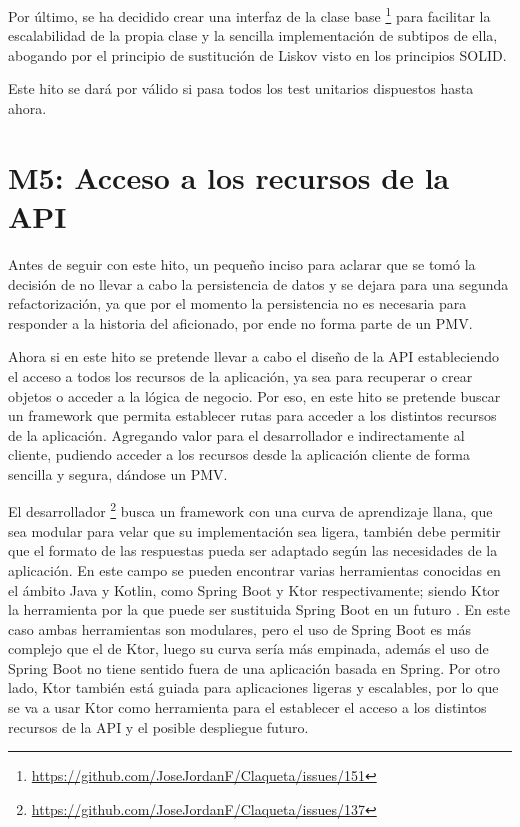 Por último, se ha decidido crear una interfaz de la clase base \footnote{\url{https://github.com/JoseJordanF/Claqueta/issues/151}}
para facilitar la escalabilidad de la propia clase y la sencilla implementación de subtipos de ella, abogando por el 
principio de sustitución de Liskov visto en los principios SOLID.

Este hito se dará por válido si pasa todos los test unitarios dispuestos hasta ahora.


\section{M5: Acceso a los recursos de la API}

Antes de seguir con este hito, un pequeño inciso para aclarar que se tomó la decisión de no llevar a cabo la 
persistencia de datos y se dejara para una segunda refactorización, ya que por el momento la persistencia no es 
necesaria para responder a la historia del aficionado, por ende no forma parte de un PMV.

Ahora si en este hito se pretende llevar a cabo el diseño de la API estableciendo el  acceso a todos 
los recursos de la aplicación, ya sea para recuperar o crear objetos o acceder a la 
lógica de negocio. Por eso, en este hito se pretende buscar un framework que permita establecer rutas para acceder a los 
distintos recursos de la aplicación. Agregando valor para el desarrollador e indirectamente al cliente, pudiendo acceder 
a los recursos desde la aplicación cliente de forma sencilla y segura, dándose un PMV.

El desarrollador \footnote{\url{https://github.com/JoseJordanF/Claqueta/issues/137}} busca un framework con una
curva de aprendizaje llana, que sea modular\cite{modularSoft} para velar que su implementación sea ligera, 
también debe permitir que el formato de las respuestas pueda ser adaptado según las necesidades de la aplicación.
En este campo se pueden encontrar varias herramientas conocidas en el ámbito Java y Kotlin, como Spring 
Boot y Ktor respectivamente; siendo Ktor la herramienta por la que puede ser sustituida Spring Boot en un futuro 
\cite{ktorVSsboot}. En este caso ambas herramientas son modulares, pero el uso de Spring Boot es más complejo que el 
de Ktor, luego su curva sería más empinada, además el uso de Spring Boot no tiene sentido fuera de una aplicación 
basada en Spring\cite{springFrameW}. Por otro lado, Ktor también está guiada para aplicaciones ligeras y escalables, 
por lo que se va a usar Ktor como herramienta para el establecer el acceso a los distintos recursos de la API y el 
posible despliegue futuro.

